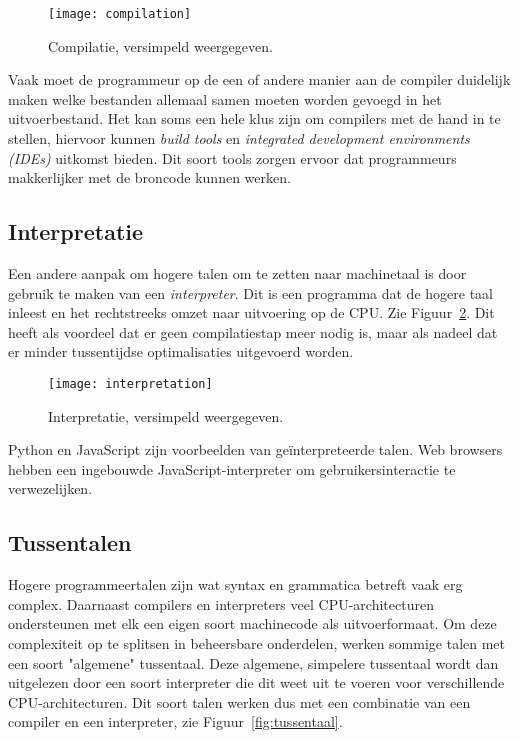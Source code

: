 \begin{figure}[H]
    \centering
    \texttt{[image: compilation]}
    \caption{Compilatie, versimpeld weergegeven.}
    \label{fig:compiler}
\end{figure}

Vaak moet de programmeur op de een of andere manier aan de compiler duidelijk 
maken welke bestanden allemaal samen moeten worden gevoegd in het uitvoerbestand.
Het kan soms een hele klus zijn om compilers met de hand in te stellen, 
hiervoor kunnen \textit{build tools} en 
\textit{integrated development environments (IDEs)}
uitkomst bieden. Dit soort tools zorgen ervoor dat programmeurs 
makkerlijker met de broncode kunnen werken.

\subsection{Interpretatie}
Een andere aanpak om hogere talen om te zetten naar machinetaal is door 
gebruik te maken van een \textit{interpreter}. Dit is een programma dat 
de hogere taal inleest en het rechtstreeks omzet naar uitvoering op de 
CPU. Zie Figuur~\ref{fig:interpreter}. Dit heeft als voordeel dat er geen compilatiestap meer nodig is, 
maar als nadeel dat er minder tussentijdse optimalisaties uitgevoerd worden.

\begin{figure}[H]
    \centering
    \texttt{[image: interpretation]}
    \caption{Interpretatie, versimpeld weergegeven.}
    \label{fig:interpreter}
\end{figure}

Python en JavaScript zijn voorbeelden van geïnterpreteerde talen. Web browsers
hebben een ingebouwde JavaScript-interpreter om gebruikersinteractie te verwezelijken.

\subsection{Tussentalen}
Hogere programmeertalen zijn wat syntax en grammatica betreft vaak 
erg complex. Daarnaast compilers en interpreters veel CPU-architecturen 
ondersteunen met elk een eigen soort machinecode als uitvoerformaat.
Om deze complexiteit op te splitsen in beheersbare onderdelen, 
werken sommige talen met een soort "algemene" tussentaal. Deze algemene,
simpelere tussentaal wordt dan uitgelezen door een soort interpreter 
die dit weet uit te voeren voor verschillende CPU-architecturen.
Dit soort talen werken dus met een combinatie van een compiler en 
een interpreter, zie Figuur~\ref{fig:tussentaal}.

